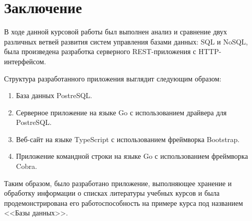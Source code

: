 \section*{Заключение}

В ходе данной курсовой работы был выполнен анализ и сравнение двух различных ветвей развития
систем управления базами данных: SQL и NoSQL, была произведена разработка серверного REST-приложения
с HTTP-интерфейсом.

Структура разработанного приложения выглядит следующим образом:

\begin{enumerate}
    \item База данных PostreSQL.
    \item Серверное приложение на языке Go с использованием драйвера для PostreSQL.
    \item Веб-сайт на языке TypeScript с использованием фреймворка Bootstrap.
    \item Приложение командной строки на языке Go с использованием фреймворка Cobra.
\end{enumerate}

Таким образом, было разработано приложение, выполняющее хранение и обработку информации о списках
литературы учебных курсов и была продемонстрирована его работоспособность на примере курса под
названием <<Базы данных>>.